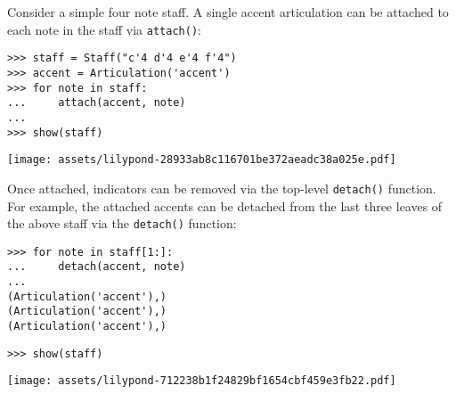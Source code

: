 Consider a simple four note staff. A single accent articulation can be attached
to each note in the staff via \texttt{attach()}:

\begin{comment}
<abjad>
staff = Staff("c'4 d'4 e'4 f'4")
accent = Articulation('accent')
for note in staff:
    attach(accent, note)

show(staff)
</abjad>
\end{comment}

\begin{abjadbookoutput}
\begin{singlespacing}
\vspace{-0.5\baselineskip}
\begin{lstlisting}
>>> staff = Staff("c'4 d'4 e'4 f'4")
>>> accent = Articulation('accent')
>>> for note in staff:
...     attach(accent, note)
...
>>> show(staff)
\end{lstlisting}
\noindent\texttt{[image: assets/lilypond-28933ab8c116701be372aeadc38a025e.pdf]}
\end{singlespacing}
\end{abjadbookoutput}

\noindent Once attached, indicators can be removed via the top-level
\texttt{detach()} function. For example, the attached accents can be detached
from the last three leaves of the above staff via the \texttt{detach()}
function:

\begin{comment}
<abjad>
for note in staff[1:]:
    detach(accent, note)

show(staff)
</abjad>
\end{comment}

\begin{abjadbookoutput}
\begin{singlespacing}
\vspace{-0.5\baselineskip}
\begin{lstlisting}
>>> for note in staff[1:]:
...     detach(accent, note)
...
(Articulation('accent'),)
(Articulation('accent'),)
(Articulation('accent'),)
\end{lstlisting}
\begin{lstlisting}
>>> show(staff)
\end{lstlisting}
\noindent\texttt{[image: assets/lilypond-712238b1f24829bf1654cbf459e3fb22.pdf]}
\end{singlespacing}
\end{abjadbookoutput}

